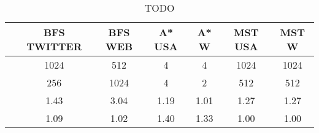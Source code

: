 \begin{table}[h]
\centring
\begin{tabular}{ |c|c|c|c|c|c|c| }
\hline
 & \large{\textbf{BFS TWITTER}} & \large{\textbf{BFS WEB}} & \large{\textbf{A* USA}} & \large{\textbf{A* W}} & \large{\textbf{MST USA}} & \large{\textbf{MST W}} \\
\hline
\insbatch{} & 1024 & 512 & 4 & 4 & 1024 & 1024 \\
\hline
\delbatch{} & 256 & 1024 & 4 & 2 & 512 & 512 \\
\hline
\speed{} & 1.43 & 3.04 & 1.19 & 1.01 & 1.27 & 1.27 \\
\hline
\workinc{} & 1.09 & 1.02 & 1.40 & 1.33 & 1.00 & 1.00 \\
\hline
\end{tabular}
\vspace{0.3em}
\caption{TODO }
\label{table:todo}
\end{table}
